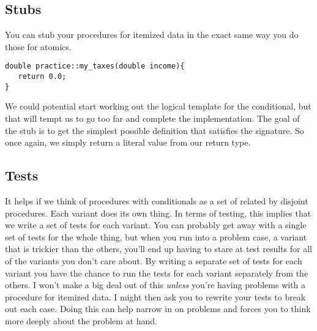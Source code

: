 \documentclass[]{tufte-handout}
\begin{document}
\subsection{Stubs}

You can stub your procedures for itemized data in the exact same way you do those for atomics. 
\begin{verbatim}
double practice::my_taxes(double income){
   return 0.0;
}
\end{verbatim}

We could potential start working out the logical template for the conditional, but that will tempt us to go too far and complete the implementation. The goal of the stub is to get the simplest possible definition that satisfies the signature. So once again, we simply return a literal value from our return type.

\subsection{Tests}

It helps if we think of procedures with conditionals as a set of related by disjoint procedures. Each variant does its own thing.  In terms of testing, this implies that we write a set of tests for each variant. You can probably get away with a single set of tests for the whole thing, but when you run into a problem case, a variant that is trickier than the others, you'll end up having to stare at test results for all of the variants you don't care about. By writing a separate set of tests for each variant you have the chance to run the tests for each variant separately from the others. I won't make a big deal out of this \textit{unless} you're having problems with a procedure for itemized data. I might then ask you to rewrite your tests to break out each case. Doing this can help narrow in on problems and forces you to think more deeply about the problem at hand. 
\end{document}
